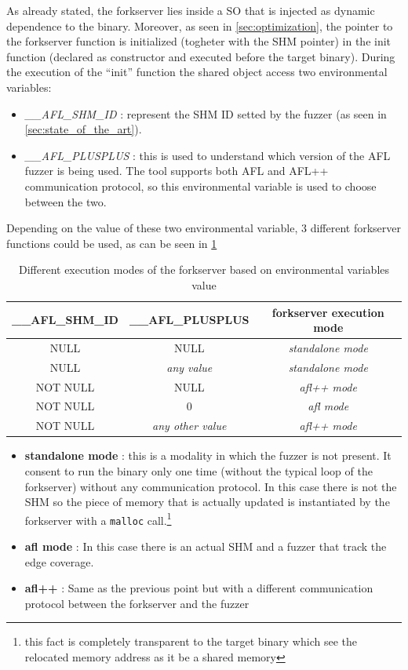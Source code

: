 As already stated, the forkserver lies inside a \gls{SO} that is injected as dynamic dependence to the binary.
Moreover, as seen in \cref{sec:optimization}, the pointer to the forkserver function is initialized 
(togheter with the \gls{SHM} pointer) in the init function (declared as constructor and executed before the target binary).
During the execution of the ``init'' function the shared object access two environmental variables:
\begin{itemize}
    \item \textit{\_\_AFL\_SHM\_ID} : represent the \gls{SHM} ID setted by the fuzzer (as seen in \cref{sec:state_of_the_art}). 
    \item \textit{\_\_AFL\_PLUSPLUS} : this is used to understand which version of the AFL fuzzer is being used. 
        The tool supports both AFL and AFL++ communication protocol, so this environmental variable is used to choose between the two.
\end{itemize}
Depending on the value of these two environmental variable, 3 different forkserver functions could be used, 
as can be seen in 
\cref{tab:forkserver_modes}
\begin{table}[ht]
    \centering
    \caption{Different execution modes of the forkserver based on environmental variables value}
    \label{tab:forkserver_modes}
    \begin{tabular}{c|c|c}
    \hline
    \textbf{\_\_AFL\_SHM\_ID} & \textbf{\_\_AFL\_PLUSPLUS} & forkserver execution mode\\
    \hline
    NULL & NULL & \textit{standalone mode}\\
    \hline
    NULL & \textit{any value} & \textit{standalone mode}\\
    \hline
    NOT NULL & NULL & \textit{afl++ mode}\\
    \hline
    NOT NULL & 0 & \textit{afl mode}\\
    \hline
    NOT NULL & \textit{any other value} & \textit{afl++ mode}\\
        
    \end{tabular}
\end{table}
\begin{itemize}
    \item \textbf{standalone mode} : this is a modality in which the fuzzer is not present. It consent to run the binary  
    only one time (without the typical loop of the forkserver) without any communication protocol. In this case there is not 
    the \gls{SHM} so the piece of memory that is actually updated is instantiated by the forkserver with a \texttt{malloc} call.\footnote{
        this fact is completely transparent to the target binary which see the relocated memory address as it be a shared memory
    }
    \item \textbf{afl mode} : In this case there is an actual \gls{SHM} and a fuzzer that track the edge coverage.
    \item \textbf{afl++} : Same as the previous point but with a different communication protocol between the forkserver 
        and the fuzzer
\end{itemize}

